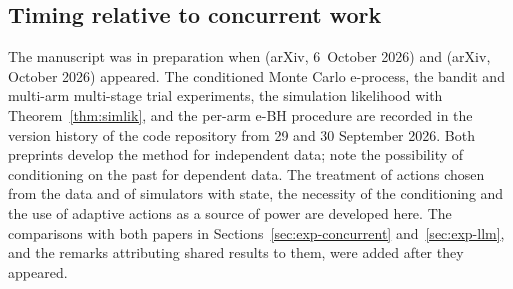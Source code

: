 \documentclass[pdflatex,sn-mathphys-ay]{sn-jnl}
\theoremstyle{thmstyleone}
\theoremstyle{thmstyletwo}
\begin{document}
\begin{appendices}
\section{Timing relative to concurrent work}\label{app:timeline}

The manuscript was in preparation when \citet{forre2026anytime} (arXiv,
6~October 2026) and \citet{cortinovis2026slice} (arXiv, October 2026)
appeared. The conditioned Monte Carlo e-process, the bandit and multi-arm
multi-stage trial experiments, the simulation likelihood with
Theorem~\ref{thm:simlik}, and the per-arm e-BH procedure are recorded in the
version history of the code repository from 29 and 30 September 2026. Both
preprints develop the method for independent data;
\citet[Appendix~C.1.1]{cortinovis2026slice} note the possibility of
conditioning on the past for dependent data. The treatment of actions chosen
from the data and of simulators with state, the necessity of the conditioning
and the use of adaptive actions as a source of power are developed here. The comparisons with both papers in
Sections~\ref{sec:exp-concurrent} and~\ref{sec:exp-llm}, and the remarks
attributing shared results to them, were added after they appeared.
\end{appendices}


\end{document}
